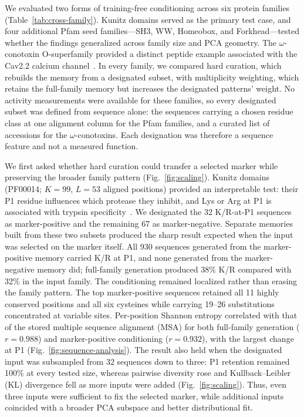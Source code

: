 
We evaluated two forms of training-free conditioning across six protein families
(Table~\ref{tab:cross-family}). Kunitz domains served as the primary test case, and four
additional Pfam seed families---SH3, WW, Homeobox, and Forkhead---tested whether the findings
generalized across family size and PCA geometry. The $\omega$-conotoxin O-superfamily provided
a distinct peptide example associated with the Cav2.2 calcium
channel~\cite{omegaConotoxinSAR2006}. In every family, we
compared hard curation, which rebuilds the memory from a designated subset, with multiplicity
weighting, which retains the full-family memory but increases the designated patterns' weight.
No activity measurements were available for these families, so every designated subset was
defined from sequence alone: the sequences carrying a chosen residue class at one alignment
column for the Pfam families, and a curated list of accessions for the $\omega$-conotoxins.
Each designation was therefore a sequence feature and not a measured function.

\DisplayCrossFamily

We first asked whether hard curation could transfer a selected marker while preserving the
broader family pattern (Fig.~\ref{fig:scaling}). Kunitz domains (PF00014; $K=99$, $L=53$ aligned positions) provided an
interpretable test: their P1 residue influences which protease they inhibit, and Lys or Arg at
P1 is associated with trypsin specificity~\cite{laskowskiProteinInhibitors1980}. We designated the
32 K/R-at-P1 sequences as marker-positive and the remaining 67 as marker-negative.
Separate memories built from these two subsets produced the sharp result expected when the
input was selected on the marker itself. All 930 sequences generated from the marker-positive
memory carried K/R at P1, and none generated from the marker-negative memory did; full-family
generation produced 38\% K/R compared with 32\% in the input family. The conditioning remained
localized rather than erasing the family pattern. The top marker-positive sequences retained
all 11 highly conserved positions and all six cysteines
while carrying 19--26 substitutions concentrated at variable sites. Per-position Shannon
entropy correlated with that of the stored multiple sequence alignment (MSA) for both full-family
generation ($r=0.988$) and marker-positive conditioning ($r=0.932$), with the largest change
at P1 (Fig.~\ref{fig:sequence-analysis}). The result also held when the designated input was
subsampled from 32 sequences down to three: P1 retention remained 100\% at every tested size,
whereas pairwise diversity rose and Kullback--Leibler (KL) divergence fell as more inputs were
added (Fig.~\ref{fig:scaling}). Thus, even three inputs were sufficient to fix the selected
marker, while additional inputs coincided with a broader PCA subspace and better distributional fit.


